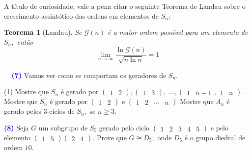 \documentclass[12pt, a4paper]{article}
\newcommand{\negrito}[1]{\mbox{\boldmath{$#1$}}}
\newtheorem{teo}{Teorema}
\begin{document}
A título de curiosidade, vale a pena citar o seguinte Teorema de Landau sobre o crescimento assintótico das ordens em elementos de $S_n:$
\begin{teo}[Landau]
Se $\mathcal{G}(n)$ é a maior ordem possível para um elemento de $S_n,$ então
\[
\lim\limits_{n \to \infty} \frac{\ln \mathcal{G}(n)}{\sqrt{n \ln n}} = 1
\]
\end{teo}
\textcolor{white}{oi}\newline
\textcolor{blue}{\bf(7)}\label{70} Vamos ver como se comportam os geradores de $S_n.$
\begin{tasks}[counter-format={(tsk[a])},label-width=3.6ex, label-format = {\bfseries}, column-sep = {0pt}](1)
\task[\textcolor{Floresta}{$\negrito{(a)} $}] Mostre que $S_n$ é gerado por $\left(\begin{array}{cc} 1 & 2 \end{array}\right),\left(\begin{array}{cc} 1 & 3 \end{array}\right),$ $\ldots, \left(\begin{array}{cc} 1 & n-1 \end{array}, \begin{array}{cc} 1 & n \end{array}\right).$
\task[\textcolor{Floresta}{$\negrito{(b)} $}] Mostre que $S_n$ é gerado por $\left(\begin{array}{cc} 1 & 2 \end{array}\right)$ e $\left(\begin{array}{cccc} 1 & 2 & \cdots & n \end{array}\right)$
\task[\textcolor{Floresta}{$\negrito{(c)} $}] Mostre que $A_n$ é gerado pelos $3$-ciclos de $S_n,$ se $n \ge 3.$
\end{tasks}
\textcolor{blue}{\bf(8)}\label{71} Seja $G$ um subgrupo de $S_5$ gerado pelo ciclo $\left(\begin{array}{ccccc} 1 & 2 & 3& 4 &5 \end{array}\right)$ e pelo elemento $\left(\begin{array}{cc} 1 & 5 \end{array}\right)\left(\begin{array}{cc} 2 & 4 \end{array}\right).$ Prove que $G \cong D_5,$ onde $D_5$ é o grupo diedral de ordem $10.$%
\newline
\newline
\end{document}
